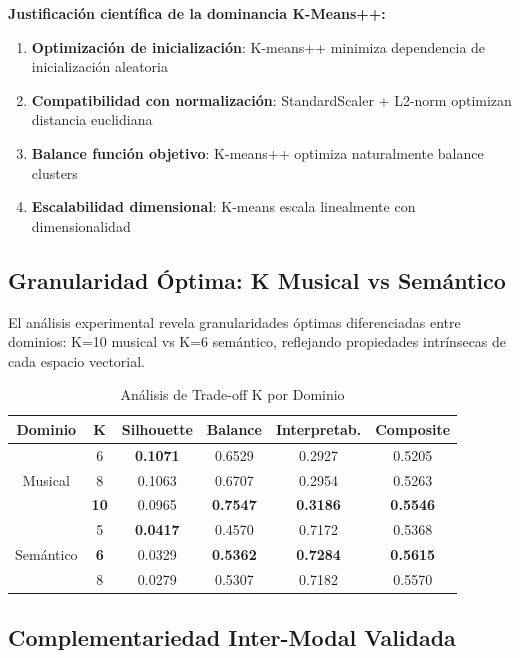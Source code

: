 \documentclass[12pt,a4paper]{article}
\begin{document}
\textbf{Justificación científica de la dominancia K-Means++:}
\begin{enumerate}
    \item \textbf{Optimización de inicialización}: K-means++ minimiza dependencia de inicialización aleatoria
    \item \textbf{Compatibilidad con normalización}: StandardScaler + L2-norm optimizan distancia euclidiana
    \item \textbf{Balance función objetivo}: K-means++ optimiza naturalmente balance clusters
    \item \textbf{Escalabilidad dimensional}: K-means escala linealmente con dimensionalidad
\end{enumerate}

\subsection{Granularidad Óptima: K Musical vs Semántico}

El análisis experimental revela granularidades óptimas diferenciadas entre dominios: K=10 musical vs K=6 semántico, reflejando propiedades intrínsecas de cada espacio vectorial.

\begin{table}[H]
\centering
\caption{Análisis de Trade-off K por Dominio}
\begin{tabular}{|c|c|c|c|c|c|}
\hline
\textbf{Dominio} & \textbf{K} & \textbf{Silhouette} & \textbf{Balance} & \textbf{Interpretab.} & \textbf{Composite} \\
\hline
\multirow{3}{*}{Musical} & 6 & \textbf{0.1071} & 0.6529 & 0.2927 & 0.5205 \\
\cline{2-6}
& 8 & 0.1063 & 0.6707 & 0.2954 & 0.5263 \\
\cline{2-6}
& \textbf{10} & 0.0965 & \textbf{0.7547} & \textbf{0.3186} & \textbf{0.5546} \\
\hline
\multirow{3}{*}{Semántico} & 5 & \textbf{0.0417} & 0.4570 & 0.7172 & 0.5368 \\
\cline{2-6}
& \textbf{6} & 0.0329 & \textbf{0.5362} & \textbf{0.7284} & \textbf{0.5615} \\
\cline{2-6}
& 8 & 0.0279 & 0.5307 & 0.7182 & 0.5570 \\
\hline
\end{tabular}
\end{table}

\subsection{Complementariedad Inter-Modal Validada}
\end{document}
